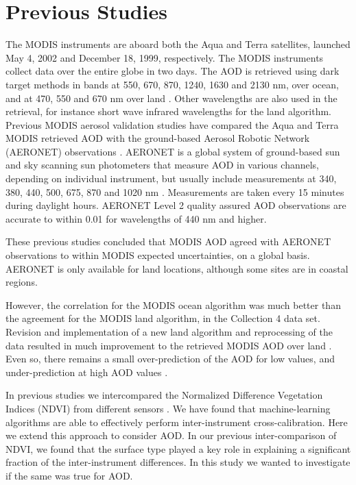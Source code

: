 \documentclass[journal]{IEEEtran}
\begin{document}
\section{Previous Studies}

The MODIS instruments are aboard both the Aqua and Terra satellites, launched May 4, 2002 and December 18, 1999, respectively. The MODIS instruments collect data over the entire globe in two days. The AOD is retrieved using dark target methods in bands at 550, 670, 870, 1240, 1630 and 2130 nm, over ocean, and at 470, 550 and 670 nm over land \cite{Remer:2005, Levy:2007}. Other wavelengths are also used in the retrieval, for instance short wave infrared wavelengths for the land algorithm. Previous MODIS aerosol validation studies have compared the Aqua and Terra MODIS retrieved AOD with the ground-based Aerosol Robotic Network (AERONET) observations \cite{Remer:2005}.  AERONET is a global system of ground-based sun and sky scanning sun photometers that measure AOD in various channels, depending on individual instrument, but usually include measurements at 340, 380, 440, 500, 675, 870 and 1020 nm \cite{Holben:1998}. Measurements are taken every 15 minutes during daylight hours.  AERONET Level 2 quality assured AOD observations are accurate to within 0.01 for wavelengths of 440 nm and higher.

These previous studies concluded that MODIS AOD agreed with AERONET observations to within MODIS expected uncertainties, on a global basis. AERONET is only available for land locations, although some sites are in coastal regions.

However, the correlation for the MODIS ocean algorithm was much better than the agreement for the MODIS land algorithm, in the Collection 4 data set.  Revision and implementation of a new land algorithm and reprocessing of the data resulted in much improvement to the retrieved MODIS AOD over land \cite{Levy:2007}. Even so, there remains a small over-prediction of the AOD for low values, and under-prediction at high AOD values
\cite{Levy:2007, Remer:2008}. 

In previous studies we intercompared the Normalized Difference Vegetation Indices (NDVI) from different sensors \cite{Brown:2008}.  We have found that machine-learning algorithms are able to effectively perform inter-instrument cross-calibration. Here we extend this approach to consider AOD. In our previous inter-comparison of NDVI, we found that the surface type played a key role in explaining a significant fraction of the inter-instrument differences. In this study we wanted to investigate if the same was true for AOD. 
\end{document}
